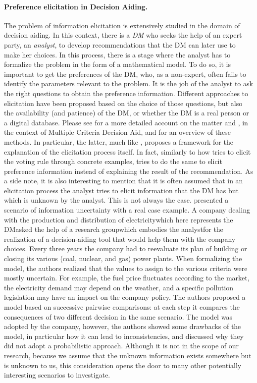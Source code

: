 \paragraph{Preference elicitation in Decision Aiding.}
The problem of information elicitation is extensively studied in the domain of decision aiding. In this context, there is a \textit{\ac{DM}} who seeks the help of an expert party, an \textit{analyst}, to develop recommendations that the \ac{DM} can later use to make her choices. In this process, there is a stage where the analyst has to formalize the problem in the form of a mathematical model. To do so, it is important to get the preferences of the \ac{DM}, who, as a non-expert, often fails to identify the parameters relevant to the problem. It is the job of the analyst to ask the right questions to obtain the preference information.
Different approaches to elicitation have been proposed based on the choice of those questions, but also the availability (and patience) of the \ac{DM}, or whether the \ac{DM} is a real person or a digital database.
Please see \citet{Bouyssou2006} for a more detailed account on the matter and \citet{Mousseau2005}, in the context of Multiple Criteria Decision Aid, and \citet{Belahcene2018} for an overview of these methods. In particular, the latter, much like \citet{Cailloux2014}, proposes a framework for the explanation of the elicitation process itself. In fact, similarly to how \citet{Cailloux2014} tries to elicit the voting rule through concrete examples, \citet{Belahcene2018} tries to do the same to elicit preference information instead of explaining the result of the recommendation.
As a side note, it is also interesting to mention that it is often assumed that in an elicitation process the analyst tries to elicit information that the \ac{DM} has but which is unknown by the analyst. This is not always the case. 
\citet[Ch. 8]{Bouyssou2000} presented a scenario of information uncertainty with a real case example. A company dealing with the production and distribution of electricity\textemdash which here represents the \ac{DM}\textemdash asked the help of a research group\textemdash which embodies the analyst\textemdash for the realization of a decision-aiding tool that would help them with the company choices. Every three years the company had to reevaluate its plan of building or closing its various (coal, nuclear, and gas) power plants. When formalizing the model, the authors realized that the values to assign to the various criteria were mostly uncertain. For example, the fuel price fluctuates according to the market, the electricity demand may depend on the weather, and a specific pollution legislation may have an impact on the company policy. The authors proposed a model based on successive pairwise comparisons: at each step it compares the consequences of two different decision in the same scenario. The model was adopted by the company, however, the authors showed some drawbacks of the model, in particular how it can lead to inconsistencies, and discussed why they did not adopt a probabilistic approach. Although it is not in the scope of our research, because we assume that the unknown information exists somewhere but is unknown to us, this consideration opens the door to many other potentially interesting scenarios to investigate.

